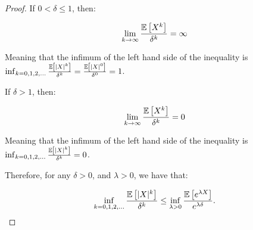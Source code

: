 \begin{proof}
If $0 < \delta \leq 1$, then:

\begin{align*}
\lim_{k \to \infty} \frac{\mathbb{E}\left[X^k\right]}{\delta^k} = \infty
\end{align*}

Meaning that the infimum of the left hand side of the inequality is $\inf_{k=0,1,2,\ldots} \frac{\mathbb{E}\left[|X|^k\right]}{\delta^k} = \frac{\mathbb{E}\left[|X|^0\right]}{\delta^0} = 1$.


If $\delta > 1$, then:

\begin{align*}
\lim_{k \to \infty} \frac{\mathbb{E}\left[X^k\right]}{\delta^k} = 0
\end{align*}

Meaning that the infimum of the left hand side of the inequality is $\inf_{k=0,1,2,\ldots} \frac{\mathbb{E}\left[|X|^k\right]}{\delta^k} = 0$.

Therefore, for any $\delta > 0$, and $\lambda > 0$, we have that:

\[ \inf_{k=0,1,2,\ldots} \frac{\mathbb{E}\left[|X|^k\right]}{\delta^k} \leq \inf_{\lambda>0} \frac{\mathbb{E}\left[e^{\lambda X}\right]}{e^{\lambda \delta}}. \]
\end{proof}